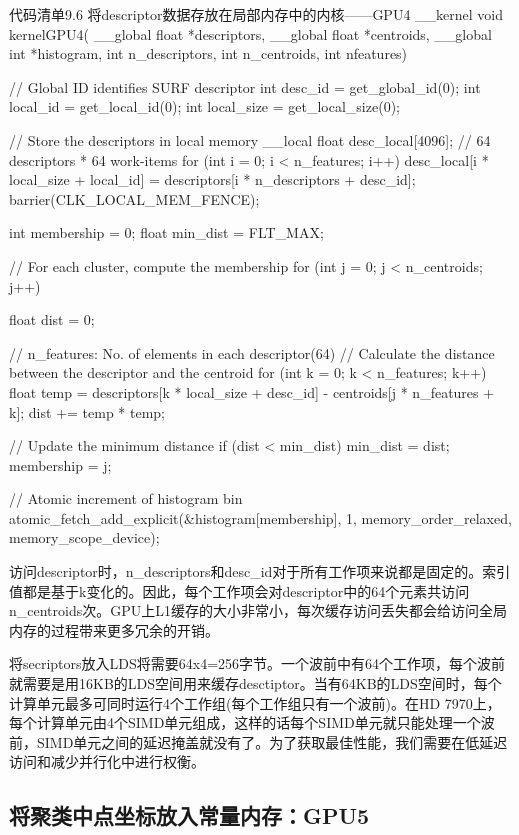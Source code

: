 \begin{codeboxt}[cpp]{代码清单9.6 将descriptor数据存放在局部内存中的内核——GPU4}
__kernel
void kernelGPU4(
  __global float *descriptors,
  __global float *centroids,
  __global int *histogram,
  int n_descriptors,
  int n_centroids,
  int nfeatures){

  // Global ID identifies SURF descriptor
  int desc_id = get_global_id(0);
  int local_id = get_local_id(0);
  int local_size = get_local_size(0);

  // Store the descriptors in local memory
  __local float desc_local[4096]; // 64 descriptors * 64 work-items
  for (int i = 0; i < n_features; i++){
    desc_local[i * local_size + local_id] =
        descriptors[i * n_descriptors + desc_id];
  }
  barrier(CLK_LOCAL_MEM_FENCE);

  int membership = 0;
  float min_dist = FLT_MAX;

  // For each cluster, compute the membership
  for (int j = 0; j < n_centroids; j++){
    float dist = 0;

    // n_features: No. of elements in each descriptor(64)
    // Calculate the distance between the descriptor and the centroid
    for (int k = 0; k < n_features; k++){
      float temp = descriptors[k * local_size + desc_id] -
        centroids[j * n_features + k];
      dist += temp * temp;
    }

    // Update the minimum distance
    if (dist < min_dist){
      min_dist = dist;
      membership = j;
    }
  }

  // Atomic increment of histogram bin
  atomic_fetch_add_explicit(&histogram[membership], 1, memory_order_relaxed, memory_scope_device);
}
\end{codeboxt}

访问descriptor时，n\_\allowbreak{}descriptors和desc\_\allowbreak{}id对于所有工作项来说都是固定的。索引值都是基于k变化的。因此，每个工作项会对descriptor中的64个元素共访问n\_\allowbreak{}centroids次。GPU上L1缓存的大小非常小，每次缓存访问丢失都会给访问全局内存的过程带来更多冗余的开销。

将secriptors放入LDS将需要64x4=256字节。一个波前中有64个工作项，每个波前就需要是用16KB的LDS空间用来缓存desctiptor。当有64KB的LDS空间时，每个计算单元最多可同时运行4个工作组(每个工作组只有一个波前)。在HD 7970上，每个计算单元由4个SIMD单元组成，这样的话每个SIMD单元就只能处理一个波前，SIMD单元之间的延迟掩盖就没有了。为了获取最佳性能，我们需要在低延迟访问和减少并行化中进行权衡。

\subsection{将聚类中点坐标放入常量内存：GPU5}

